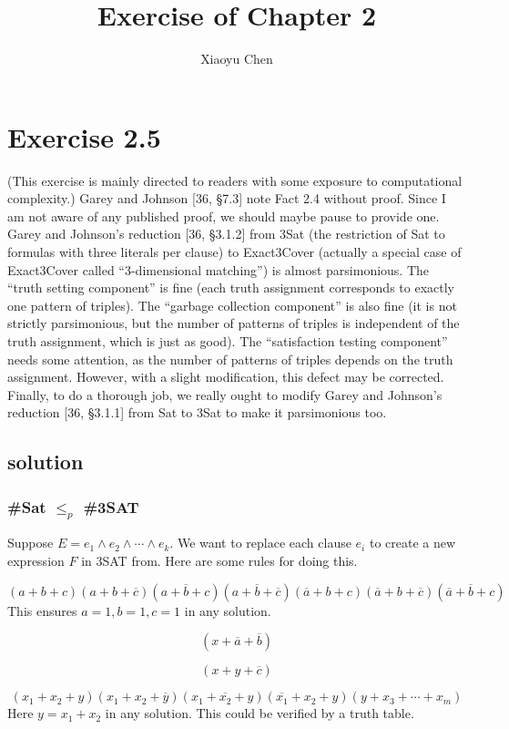 \documentclass{article}
\title{Exercise of Chapter 2}
\author{Xiaoyu Chen}
\date{}
\begin{document}
\maketitle
\section{Exercise 2.5}
(This exercise is mainly directed to readers with some exposure to computational complexity.) Garey and Johnson [36, §7.3] note Fact 2.4 without proof. Since I am not aware of any published proof, we should maybe pause to provide one. Garey and Johnson’s reduction [36, §3.1.2] from 3Sat (the restriction of Sat to formulas with three literals per clause) to Exact3Cover (actually a special case of Exact3Cover called “3-dimensional matching”) is almost parsimonious. The “truth setting component” is fine (each truth assignment corresponds to exactly one pattern of triples). The “garbage collection component” is also fine (it is not strictly parsimonious, but the number of patterns of triples is independent of the truth assignment, which is just as good). The “satisfaction testing component” needs some attention, as the number of patterns of triples depends on the truth assignment. However, with a slight modification, this defect may be corrected. Finally, to do a thorough job, we really ought to modify Garey and Johnson’s reduction [36, §3.1.1] from Sat to 3Sat to make it parsimonious too.
\subsection{solution}
\subsubsection{\#Sat $\leq_p$ \#3SAT}
Suppose  $E = e_1\land e_2\land \cdots \land e_k$. We want to replace each clause $e_i$ to create a new expression $F$ in 3SAT from. Here are some rules for doing this.
\begin{tcolorbox}[title = {Add 3 aux variables $a, b, c$ and add 7 clauses to $F$}]
  \[
    (a + b + c)(a + b + \overline{c})(a + \overline{b} + c)(a + \overline{b} + \overline{c})(\overline{a} + b + c)(\overline{a} + b + \overline{c})(\overline{a} + \overline{b} + c)
  \]
  \tcblower
  This ensures $a = 1, b = 1, c = 1$ in any solution.
\end{tcolorbox}
\begin{tcolorbox}[title = {$|e_i| = 1$, i.e. $e_i = (x)$ or $e_i = (\overline{x})$}]
  \[
    (x + \overline{a} + \overline{b})
  \]
\end{tcolorbox}
\begin{tcolorbox}[title = {$|e_i| = 2$, i.e. $e_i = (x + y)$}]
  \[
    (x + y + \overline{c})
  \]
\end{tcolorbox}
\begin{tcolorbox}[title = {$|e_i| > 3$, i.e. $e_i = (x_1 + x_2 + x_3 +\cdots + x_m)$}]
  \[
    (x_1+x_2+y)(x_1+x_2+\overline{y})(x_1+\overline{x_2}+y)(\overline{x_1}+x_2 + y)(y + x_3 + \cdots + x_m)
  \]
  \tcblower
  Here $y = x_1 + x_2$ in any solution. This could be verified by a truth table.
\end{tcolorbox}
\end{document}
